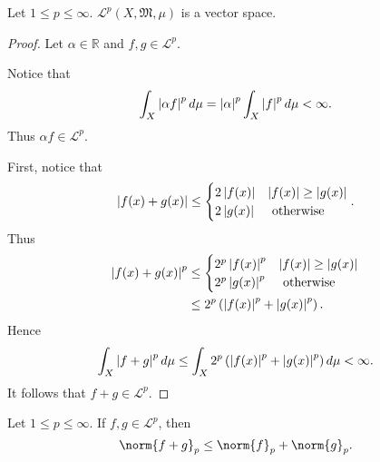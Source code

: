 \documentclass[notoc,notitlepage]{tufte-book}
\begin{document}
\begin{propo}\label{propo:_cal_l_p_spaces_are_vector_spaces}
  Let $1 \leq p \leq \infty$.
  $\mathcal{L}^p(X, \mathfrak{M}, \mu)$ is a vector space.
\end{propo}

\begin{proof}
  Let $\alpha \in \mathbb{R}$ and $f, g \in \mathcal{L}^p$.

  \noindent
  Notice that
  \begin{equation*}
    \int_{X} \left|\alpha f\right|^p \mathop{}\!d{\mu}
    = \left|\alpha\right|^p \int_{X} \left|f\right|^p \mathop{}\!d{\mu} < \infty.
  \end{equation*}
  Thus $\alpha f \in \mathcal{L}^p$.

  \noindent
  First, notice that
  \begin{equation*}
    \left|f(x) + g(x)\right| \leq \begin{cases}
      2 \left|f(x)\right| & \left|f(x)\right| \geq \left|g(x)\right| \\
      2 \left|g(x)\right| & \text{ otherwise }
    \end{cases}.
  \end{equation*}
  Thus
  \begin{align*}
    \left|f(x) + g(x)\right|^p &\leq \begin{cases}
      2^p \left|f(x)\right|^p & \left|f(x)\right| \geq \left|g(x)\right| \\
      2^p \left|g(x)\right|^p & \text{ otherwise }
    \end{cases} \\
    &\leq 2^p \left( \left|f(x)\right|^p + \left|g(x)\right|^p \right).
  \end{align*}
  Hence
  \begin{equation*}
    \int_{X} \left|f + g\right|^p \mathop{}\!d{\mu}
    \leq \int_{X} 2^p \left( \left|f(x)\right|^p + \left|g(x)\right|^p \right) \mathop{}\!d{\mu}
    < \infty.
  \end{equation*}
  It follows that $f + g \in \mathcal{L}^p$.
\end{proof}

\begin{thm}\label{thm:minkowski_s_inequality}
  Let $1 \leq p \leq \infty$.
  If $f, g \in \mathcal{L}^p$, then
  \begin{equation*}
    \norm{f + g}_p \leq \norm{f}_p + \norm{g}_p.
  \end{equation*}
\end{thm}
\end{document}
